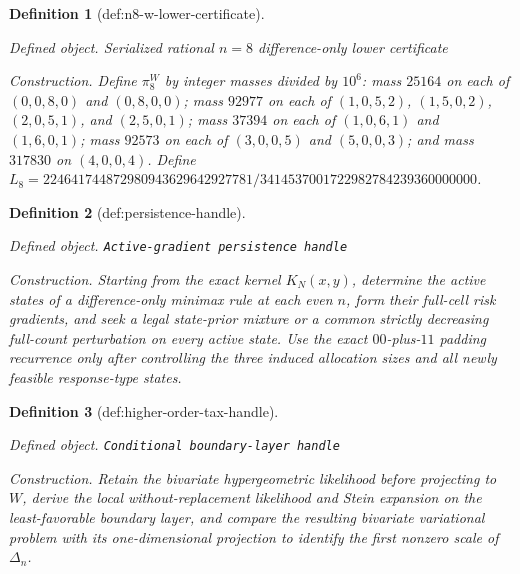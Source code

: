 \documentclass{article}
\newtheorem{definition}{Definition}
\begin{document}
\begin{definition}[def:n8-w-lower-certificate]\label{def:n8-w-lower-certificate}
\par\smallskip\noindent\emph{Defined object.} Serialized rational \(n=8\) difference-only lower certificate
\par\smallskip\noindent\emph{Construction.} Define \(\pi_8^W\) by integer masses divided by \(10^6\): mass \(25164\) on each of \((0,0,8,0)\) and \((0,8,0,0)\); mass \(92977\) on each of \((1,0,5,2)\), \((1,5,0,2)\), \((2,0,5,1)\), and \((2,5,0,1)\); mass \(37394\) on each of \((1,0,6,1)\) and \((1,6,0,1)\); mass \(92573\) on each of \((3,0,0,5)\) and \((5,0,0,3)\); and mass \(317830\) on \((4,0,0,4)\). Define \(L_8=224641744872980943629642927781/3414537001722982784239360000000\).
\end{definition}

\begin{definition}[def:persistence-handle]\label{def:persistence-handle}
\par\smallskip\noindent\emph{Defined object.} \texttt{Active-\allowbreak{}gradient persistence handle}
\par\smallskip\noindent\emph{Construction.} Starting from the exact kernel \(K_N(x,y)\), determine the active states of a difference-only minimax rule at each even \(n\), form their full-cell risk gradients, and seek a legal state-prior mixture or a common strictly decreasing full-count perturbation on every active state. Use the exact \(00\)-plus-\(11\) padding recurrence only after controlling the three induced allocation sizes and all newly feasible response-type states.
\end{definition}

\begin{definition}[def:higher-order-tax-handle]\label{def:higher-order-tax-handle}
\par\smallskip\noindent\emph{Defined object.} \texttt{Conditional boundary-\allowbreak{}layer handle}
\par\smallskip\noindent\emph{Construction.} Retain the bivariate hypergeometric likelihood before projecting to \(W\), derive the local without-replacement likelihood and Stein expansion on the least-favorable boundary layer, and compare the resulting bivariate variational problem with its one-dimensional projection to identify the first nonzero scale of \(\Delta_n\).
\end{definition}
\end{document}
